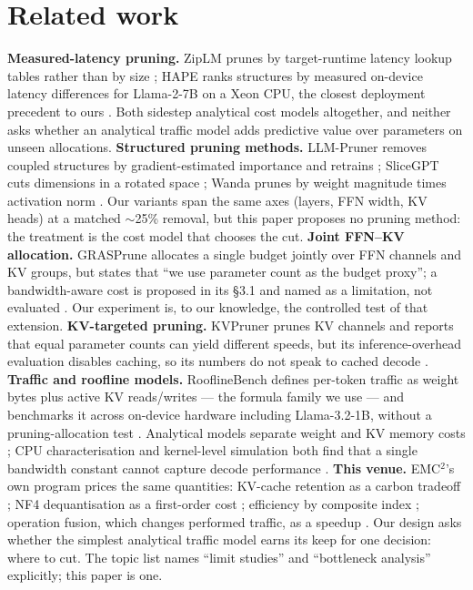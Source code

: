 \documentclass[10pt,letterpaper,twocolumn]{article}
\begin{document}
\section{Related work}
\textbf{Measured-latency pruning.} ZipLM prunes by target-runtime
latency lookup tables rather than by size \citep{ziplm2023}; HAPE ranks structures by measured on-device
latency differences for Llama-2-7B on a Xeon CPU, the closest
deployment precedent to ours \citep{hape2025}. Both sidestep
analytical cost models altogether, and neither asks whether an
analytical traffic model adds predictive value over parameters
on unseen allocations.
\textbf{Structured pruning methods.} LLM-Pruner removes coupled
structures by gradient-estimated importance and retrains
\citep{llmpruner2023}; SliceGPT cuts dimensions in a rotated
space \citep{slicegpt2024}; Wanda prunes by weight magnitude
times activation norm \citep{wanda2024}. Our variants span the
same axes (layers, FFN width, KV heads) at a matched $\sim$25\%
removal, but this paper proposes no pruning method: the treatment
is the cost model that chooses the cut.
\textbf{Joint FFN--KV allocation.} GRASPrune allocates a single
budget jointly over FFN channels and KV groups, but states that
``we use parameter count as the budget proxy''; a bandwidth-aware
cost is proposed in its \S3.1 and named as a limitation, not
evaluated \citep{grasprune2026}. Our experiment is, to our
knowledge, the controlled test of that extension.
\textbf{KV-targeted pruning.} KVPruner prunes KV channels and
reports that equal parameter counts can yield different speeds,
but its inference-overhead evaluation disables caching, so its
numbers do not speak to cached decode \citep{kvpruner2024}.
\textbf{Traffic and roofline models.} RooflineBench defines
per-token traffic as weight bytes plus active KV reads/writes ---
the formula family we use --- and benchmarks it across on-device
hardware including Llama-3.2-1B, without a pruning-allocation test
\citep{rooflinebench2026}. Analytical models separate weight and
KV memory costs \citep{pope2023}; CPU characterisation and
kernel-level simulation both find that a single bandwidth
constant cannot capture decode performance
\citep{iiswc2024,kernelsight2026}.
\textbf{This venue.} EMC$^2$'s own program prices the same
quantities: KV-cache retention as a carbon tradeoff
\citep{bassi2026}; NF4 dequantisation as a first-order cost
\citep{qi2026}; efficiency by composite index \citep{parihar2026};
operation fusion, which changes performed traffic, as a speedup
\citep{salmani2025}. Our design asks whether the simplest
analytical traffic model earns its keep for one decision: where
to cut. The topic list names ``limit studies'' and ``bottleneck
analysis'' explicitly; this paper is one.
\end{document}
